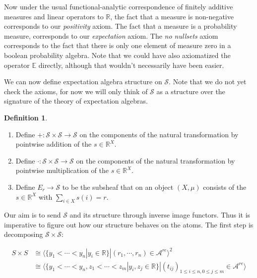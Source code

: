 \documentclass[a4paper]{amsproc}
\theoremstyle{plain}
\theoremstyle{definition}
\newtheorem{definition}[theorem]{Definition}
\theoremstyle{remark}
\numberwithin{equation}{section}
\begin{document}
Now under the usual functional-analytic correspondence of finitely additive measures and linear operators to $\mathbb{R}$, the fact that a measure is non-negative corresponds to our \emph{positivity} axiom. The fact that a measure is a probability measure, corresponds to our \emph{expectation} axiom. The \emph{no nullsets} axiom corresponds to the fact that there is only one element of measure zero in a boolean probability algebra. Note that we could have also axiomatized the operator $\mathbb{E}$ directly, although that wouldn't necessarily have been easier.


We can now define expectation algebra structure on $\mathcal{S}$. Note that we do not yet check the axioms, for now we will only think of $\mathcal{S}$ as a structure over the signature of the theory of expectation algebras.

\begin{definition}
    \begin{enumerate}
        \item Define $+: \mathcal{S} \times \mathcal{S} \to \mathcal{S}$ on the components of the natural transformation by pointwise addition of the $s \in \mathbb{R}^X$.
        \item Define $\cdot: \mathcal{S} \times \mathcal{S} \to \mathcal{S}$ on the components of the natural transformation by pointwise multiplication of the $s \in \mathbb{R}^X$.
        \item Define $E_r \xrightarrow{} \mathcal{S}$ to be the subsheaf that on an object $(X,\mu)$ consists of the $s \in \mathbb{R}^X$ with $\sum_{i \in X} s(i) = r$.
    \end{enumerate}
\end{definition}

Our aim is to send $\mathcal{S}$ and its structure through inverse image functors. Thus it is imperative to figure out how our structure behaves on the atoms. The first step is decomposing $\mathcal{S} \times \mathcal{S}$:

\begin{align*}
    S \times S &\cong \langle \{y_1 < \cdots < y_n | y_i \in \mathbb{R} \} | (r_1, \cdots, r_n) \in \mathcal{A}^{re} \rangle^2 \\
    &\cong \langle \{y_1 < \cdots < y_n, z_1 < \cdots < z_m | y_i, z_j \in \mathbb{R} \} | (t_{ij})_{1 \leq i \leq n, 0 \leq j \leq m} \in \mathcal{A}^{re} \rangle
\end{align*}
\end{document}

